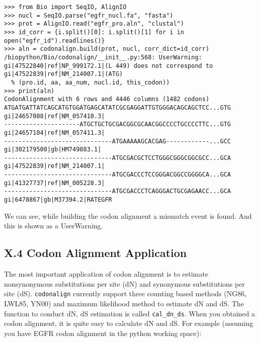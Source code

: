 \documentclass{article}
\begin{document}
\begin{verbatim}
>>> from Bio import SeqIO, AlignIO
>>> nucl = SeqIO.parse("egfr_nucl.fa", "fasta")
>>> prot = AlignIO.read("egfr_pro.aln", "clustal")
>>> id_corr = {i.split()[0]: i.split()[1] for i in open("egfr_id").readlines()}
>>> aln = codonalign.build(prot, nucl, corr_dict=id_corr)
/biopython/Bio/codonalign/__init__.py:568: UserWarning: gi|47522840|ref|NP_999172.1|(L 449) does not correspond to gi|47522839|ref|NM_214007.1|(ATG)
  % (pro.id, aa, aa_num, nucl.id, this_codon))
>>> print(aln)
CodonAlignment with 6 rows and 4446 columns (1482 codons)
ATGATGATTATCAGCATGTGGATGAGCATATCGCGAGGATTGTGGGACAGCAGCTCC...GTG gi|24657088|ref|NM_057410.3|
---------------------ATGCTGCTGCGACGGCGCAACGGCCCCTGCCCCTTC...GTG gi|24657104|ref|NM_057411.3|
------------------------------ATGAAAAAGCACGAG------------...GCC gi|302179500|gb|HM749883.1|
------------------------------ATGCGACGCTCCTGGGCGGGCGGCGCC...GCA gi|47522839|ref|NM_214007.1|
------------------------------ATGCGACCCTCCGGGACGGCCGGGGCA...GCA gi|41327737|ref|NM_005228.3|
------------------------------ATGCGACCCTCAGGGACTGCGAGAACC...GCA gi|6478867|gb|M37394.2|RATEGFR
\end{verbatim}

We can see, while building the codon alignment a mismatch event is
found. And this is shown as a UserWarning.

\subsection{X.4 Codon Alignment Application}

The most important application of codon alignment is to estimate
nonsynonymous substitutions per site (dN) and synonymous substitutions
per site (dS). \texttt{codonalign} currently support three counting
based methods (NG86, LWL85, YN00) and maximum likelihood method to
estimate dN and dS. The function to conduct dN, dS estimation is called
\texttt{cal\_dn\_ds}. When you obtained a codon alignment, it is quite
easy to calculate dN and dS. For example (assuming you have EGFR codon
alignment in the python working space):
\end{document}
